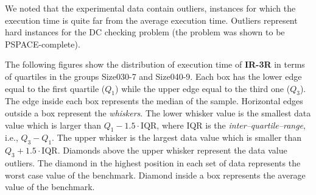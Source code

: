 \documentclass[a4paper,11pt]{article}
\begin{document}
We noted that the experimental data contain outliers, instances for which the execution time is quite far from the average execution time.
Outliers represent hard instances for the DC checking problem (the problem was shown to be PSPACE-complete).

The following figures show the distribution of execution time of \textbf{IR-3R} in terms of quartiles in the groups Size030-7 and Size040-9. 
Each box has the lower edge equal to the first quartile ($Q_1$) while the upper edge equal to the third one ($Q_3$).
The edge inside each box represents the median of the sample.
Horizontal edges outside a box represent the \textit{whiskers}. The lower whisker value is the smallest data value which is larger than $Q_1-1.5\cdot \mathrm{IQR}$, where IQR is the \textit{inter–quartile–range}, i.e.,  $Q_3-Q_1$. The upper whisker is the largest data value which is smaller than $Q_3+1.5\cdot \mathrm{IQR}$. 
Diamonds above the upper whisker represent the data value outliers. 	The diamond in the highest position in each set of data represents the worst case value of the benchmark. Diamond inside a box represents the average value of the benchmark.
\smallskip
\end{document}
